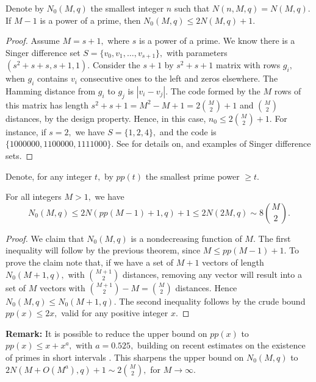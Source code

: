 \documentclass[12pt]{article}
\theoremstyle{definition}
\begin{document}
Denote by $N_0(M,q)$ the smallest integer $n$ such that $N(n,M,q)=N(M,q).$
{\prop If $M-1$ is a power of a prime, then $N_0(M,q)\le 2N(M,q)+1.$ }
\begin{proof}
 Assume $M=s+1,$ where $s$ is a power of a prime. We know there is a Singer difference set \cite{S} $S=\{v_0, v_1, \dots, v_{s+1}\},$ with parameters $(s^2+s+s,s+1,1).$
Consider the $s+1$ by $s^2+s+1$ matrix with rows $g_i,$ when $g_i$ contains $v_i$ consecutive ones to the left and zeros elsewhere. The Hamming distance from $g_i$ to $g_j$
is $|v_i-v_j|.$ The code formed by the $M$ rows of this matrix has length $s^2+s+1=M^2-M+1=2{M \choose 2}+1$ and $M \choose 2$ distances, by the design property. Hence, in this case,
$n_0\le 2{M \choose 2}+1.$ For instance, if $s=2,$ we have $S=\{1,2,4\},$ and the code is $\{1000000,1100000,1111000\}.$ See \cite[p.264]{BJL} for details on, and examples of
Singer difference sets.
\end{proof}
Denote, for any integer $t,$ by $pp(t)$ the smallest prime power $\ge t.$

{\cor \label{NT} For all integers $M>1,$ we have $$N_0(M,q)\le 2N(pp(M-1)+1,q)+1\le 2N(2M,q)\sim 8 {M \choose 2}.$$}\vspace{-1.0cm}
\begin{proof}
 We claim that $N_0(M,q)$ is a nondecreasing function of $M.$ The first inequality will follow by the previous theorem, since $M\le pp(M-1)+1.$ To prove the claim note that, if we have a set of $M+1$ vectors of length $N_0(M+1,q),$
 with ${M+1 \choose 2 }$ distances,
 removing any vector will result into a set of $M$ vectors with ${M+1 \choose 2 }-M={M \choose 2}$ distances. Hence $N_0(M,q)\le N_0(M+1,q).$ The second inequality follows
 by the crude bound $pp(x)\le 2x,$ valid for any positive integer $x.$
\end{proof}

{\bf Remark:} It is possible to reduce the upper bound on $pp(x)$ to $pp(x)\le x+x^a,$ with $a=0.525,$ building on recent estimates on the existence of primes in short intervals
\cite{BHP}. This sharpens the upper bound on $N_0(M,q)$ to $2N(M+O(M^a),q)+1\sim 2 {M \choose 2},$ for $M\rightarrow \infty.$
\end{document}

